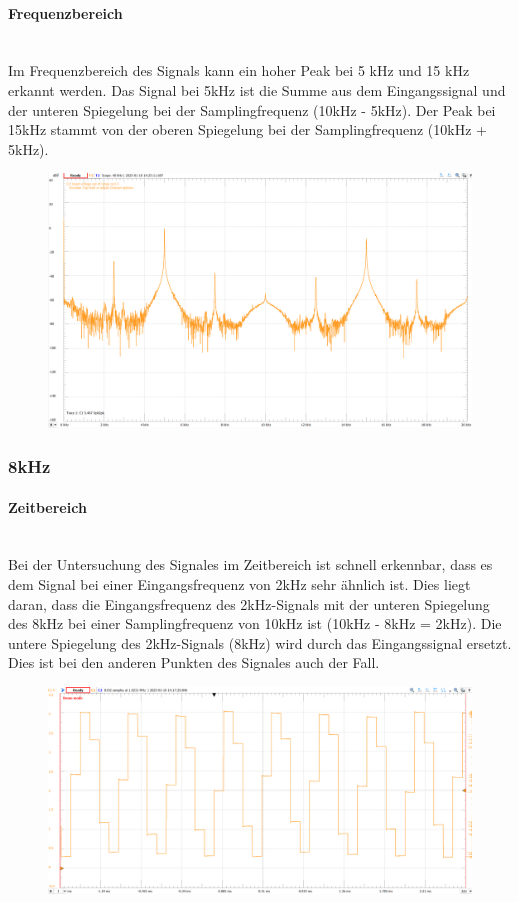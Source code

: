 \documentclass{article}
\begin{document}
\paragraph{Frequenzbereich}\mbox{}\\
Im Frequenzbereich des Signals kann ein hoher Peak bei 5 kHz und 15 kHz erkannt werden. Das Signal bei 5kHz ist die Summe aus dem Eingangssignal und der unteren Spiegelung bei der Samplingfrequenz (10kHz - 5kHz). Der Peak bei 15kHz stammt von der oberen Spiegelung bei der Samplingfrequenz (10kHz + 5kHz).
\begin{figure}[h]
    \centering
    \includegraphics[width=0.8\linewidth]{img/Freq_05.png}
\end{figure}

\subsubsection{8kHz}
\paragraph{Zeitbereich}\mbox{}\\
Bei der Untersuchung des Signales im Zeitbereich ist schnell erkennbar, dass es dem Signal bei einer Eingangsfrequenz von 2kHz sehr ähnlich ist. Dies liegt daran, dass die Eingangsfrequenz des 2kHz-Signals mit der unteren Spiegelung des 8kHz bei einer Samplingfrequenz von 10kHz ist (10kHz - 8kHz = 2kHz). Die untere Spiegelung des 2kHz-Signals (8kHz) wird durch das Eingangssignal ersetzt. Dies ist bei den anderen Punkten des Signales auch der Fall.
\begin{figure}[h]
    \centering
    \includegraphics[width=0.8\linewidth]{img/Signal_06.png}
\end{figure}
\end{document}
